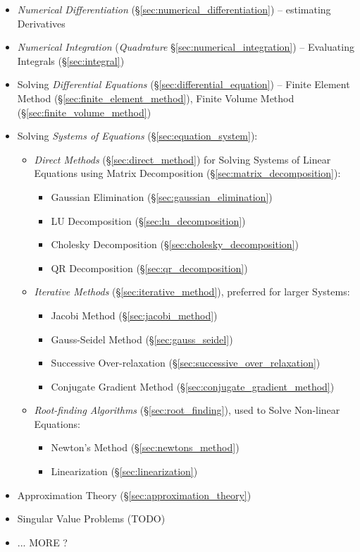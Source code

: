 \begin{itemize}
  \item \emph{Numerical Differentiation} (\S\ref{sec:numerical_differentiation})
    -- estimating Derivatives
  \item \emph{Numerical Integration} (\emph{Quadrature}
    \S\ref{sec:numerical_integration}) -- Evaluating Integrals
    (\S\ref{sec:integral})
  \item Solving \emph{Differential Equations}
    (\S\ref{sec:differential_equation}) -- Finite Element Method
    (\S\ref{sec:finite_element_method}), Finite Volume Method
    (\S\ref{sec:finite_volume_method})
  \item Solving \emph{Systems of Equations} (\S\ref{sec:equation_system}):
    \begin{itemize}
      \item \emph{Direct Methods} (\S\ref{sec:direct_method}) for Solving
        Systems of Linear Equations using Matrix Decomposition
        (\S\ref{sec:matrix_decomposition}):
        \begin{itemize}
          \item Gaussian Elimination (\S\ref{sec:gaussian_elimination})
          \item LU Decomposition (\S\ref{sec:lu_decomposition})
          \item Cholesky Decomposition (\S\ref{sec:cholesky_decomposition})
          \item QR Decomposition (\S\ref{sec:qr_decomposition})
        \end{itemize}
      \item \emph{Iterative Methods} (\S\ref{sec:iterative_method}), preferred
        for larger Systems:
        \begin{itemize}
          \item Jacobi Method (\S\ref{sec:jacobi_method})
          \item Gauss-Seidel Method (\S\ref{sec:gauss_seidel})
          \item Successive Over-relaxation
            (\S\ref{sec:successive_over_relaxation})
          \item Conjugate Gradient Method
            (\S\ref{sec:conjugate_gradient_method})
        \end{itemize}
      \item \emph{Root-finding Algorithms} (\S\ref{sec:root_finding}), used to
        Solve Non-linear Equations:
        \begin{itemize}
          \item Newton's Method (\S\ref{sec:newtons_method})
          \item Linearization (\S\ref{sec:linearization})
        \end{itemize}
    \end{itemize}
  \item Approximation Theory (\S\ref{sec:approximation_theory})
  \item Singular Value Problems (TODO)
  \item ... MORE ?
\end{itemize}

